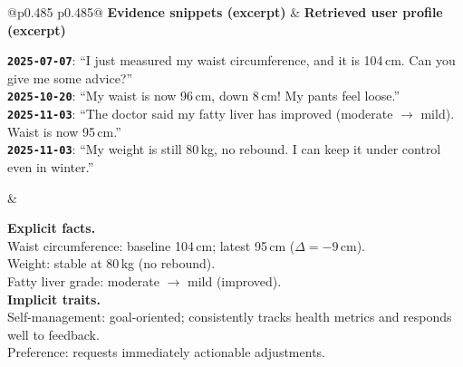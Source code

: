 \begin{table}[t]
\centering
\small
\setlength{\tabcolsep}{4pt}
\renewcommand{\arraystretch}{1.0}
\caption{Profile extraction example (de-identified): abridged evidence snippets and the resulting user profile.}
\label{tab:profile_example}
\begin{tabular}{@{}p{0.485\textwidth} p{0.485\textwidth}@{}}
\toprule
\textbf{Evidence snippets (excerpt)} & \textbf{Retrieved user profile (excerpt)} \\
\midrule
\begin{minipage}[t]{\linewidth}\vspace{0pt}\raggedright
\textbf{\texttt{2025-07-07}}: ``I just measured my waist circumference, and it is 104\,cm. Can you give me some advice?'' \\
\textbf{\texttt{2025-10-20}}: ``My waist is now 96\,cm, down 8\,cm! My pants feel loose.'' \\
\textbf{\texttt{2025-11-03}}: ``The doctor said my fatty liver has improved (moderate $\rightarrow$ mild). Waist is now 95\,cm.'' \\
\textbf{\texttt{2025-11-03}}: ``My weight is still 80\,kg, no rebound. I can keep it under control even in winter.'' \\
\end{minipage}
&
\begin{minipage}[t]{\linewidth}\vspace{0pt}\raggedright
\textbf{Explicit facts.} \\
Waist circumference: baseline 104\,cm; latest 95\,cm ($\Delta=-9\,\mathrm{cm}$). \\
Weight: stable at 80\,kg (no rebound). \\
Fatty liver grade: moderate $\rightarrow$ mild (improved). \\
\vspace{1pt}
\textbf{Implicit traits.} \\
Self-management: goal-oriented; consistently tracks health metrics and responds well to feedback. \\
Preference: requests immediately actionable adjustments. \\
\end{minipage}
\\
\bottomrule
\end{tabular}
\end{table}